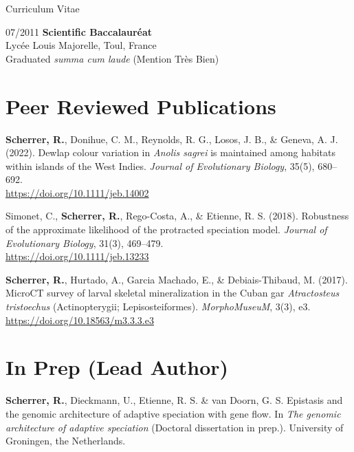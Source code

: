 \documentclass[11pt,a4paper]{article}
\begin{document}
\begin{cv}{Curriculum Vitae}
\begin{cvlist}{}
			\item[07/2011] 
			\textbf{Scientific Baccalaur\'{e}at}\\
			Lyc\'{e}e Louis Majorelle, Toul, France\\
			Graduated \textit{summa cum laude} (Mention Tr\`{e}s Bien)
			
		\end{cvlist}
	
		\section{Peer Reviewed Publications}
		
		\begin{cvlist}{}
			
			\item \textbf{Scherrer, R.}, Donihue, C. M., Reynolds, R. G., Losos, J. B., \& Geneva, A. J. (2022). Dewlap colour variation in \textit{Anolis sagrei} is maintained among habitats within islands of the West Indies. \textit{Journal of Evolutionary Biology}, 35(5), 680–692.\\ \url{https://doi.org/10.1111/jeb.14002}
			
			\item Simonet, C., \textbf{Scherrer, R.}, Rego-Costa, A., \& Etienne, R. S. (2018). Robustness of the approximate likelihood of the protracted speciation model. \textit{Journal of Evolutionary Biology}, 31(3), 469–479.\\ \url{https://doi.org/10.1111/jeb.13233}
			
			\item \textbf{Scherrer, R.}, Hurtado, A., Garcia Machado, E., \& Debiais-Thibaud, M. (2017). MicroCT survey of larval skeletal mineralization in the Cuban gar \textit{Atractosteus tristoechus} (Actinopterygii; Lepisosteiformes). \textit{MorphoMuseuM}, 3(3), e3.\\ \url{https://doi.org/10.18563/m3.3.3.e3}
			
		\end{cvlist}

        \section{In Prep (Lead Author)}

        \begin{cvlist}{}

            \item[]
            \textbf{Scherrer, R.}, Dieckmann, U., Etienne, R. S. \& van Doorn, G. S. Epistasis and the genomic architecture of adaptive speciation with gene flow. In \textit{The genomic architecture of adaptive speciation} (Doctoral dissertation in prep.). University of Groningen, the Netherlands.


\end{cvlist}
\end{cv}
\end{document}
